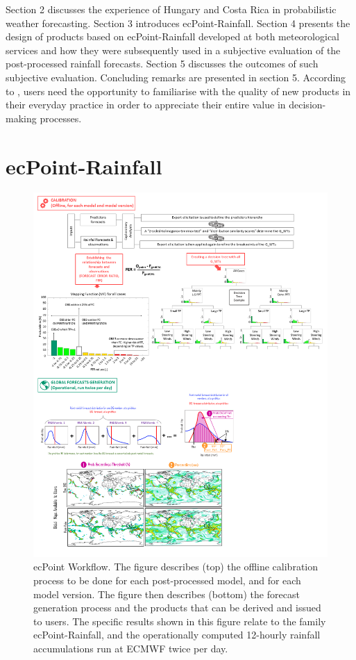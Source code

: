 \documentclass[twocol]{ametsocV5} %
\begin{document}
Section 2 discusses the experience of Hungary and Costa Rica in probabilistic weather forecasting. Section 3  introduces ecPoint-Rainfall. Section 4 presents the design of products based on ecPoint-Rainfall developed at both meteorological services and how they were subsequently used in a subjective evaluation of the post-processed rainfall forecasts. Section 5 discusses the outcomes of such subjective evaluation. Concluding remarks are presented in section 5.
According to \citet{Fundel2019}, users need the opportunity to familiarise with the quality of new products in their everyday practice in order to appreciate their entire value in decision-making processes.




\section{ecPoint-Rainfall}

\begin{figure}
\centerline{\includegraphics[width=39pc]{manuscript/Figures/Fig1.png}}
\caption{ecPoint Workflow. The figure describes (top) the offline calibration process to be done for each post-processed model, and for each model version. The figure then describes (bottom) the forecast generation process and the products that can be derived and issued to users. The specific results shown in this figure relate to the family ecPoint-Rainfall, and the operationally computed 12-hourly rainfall accumulations run at ECMWF twice per day.}
\label{Fig.1}
\end{figure}
\end{document}
